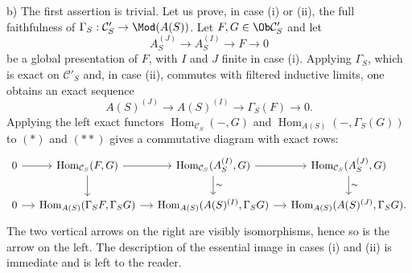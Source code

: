 b) The first assertion is trivial. Let us prove, in case (i) or (ii), the full faithfulness of $\Gamma_S:\mathcal C'_S\to\Mod(A(S))$. Let $F,G\in\Ob\mathcal C'_S$ and let
\[
A_S^{(J)}\longrightarrow A_S^{(I)}\longrightarrow F\longrightarrow0
\tag{$*$}
\]
be a global presentation of $F$, with $I$ and $J$ finite in case (i). Applying $\Gamma_S$, which is exact on $\mathcal C'_S$ and, in case (ii), commutes with filtered inductive limits, one obtains an exact sequence
\[
A(S)^{(J)}\longrightarrow A(S)^{(I)}\longrightarrow\Gamma_S(F)\longrightarrow0.
\tag{$**$}
\]
Applying the left exact functors $\operatorname{Hom}_{\mathcal C_S}(-,G)$ and $\operatorname{Hom}_{A(S)}(-,\Gamma_S(G))$ to $(*)$ and $(**)$ gives a commutative diagram with exact rows:
\[
\begin{tikzcd}[column sep=small]
0 \arrow[r] & \operatorname{Hom}_{\mathcal C_S}(F,G) \arrow[r] \arrow[d] &
\operatorname{Hom}_{\mathcal C_S}(A_S^{(I)},G) \arrow[r] \arrow[d,"\sim"] &
\operatorname{Hom}_{\mathcal C_S}(A_S^{(J)},G) \arrow[d,"\sim"] \\
0 \arrow[r] & \operatorname{Hom}_{A(S)}(\Gamma_SF,\Gamma_SG) \arrow[r] &
\operatorname{Hom}_{A(S)}(A(S)^{(I)},\Gamma_SG) \arrow[r] &
\operatorname{Hom}_{A(S)}(A(S)^{(J)},\Gamma_SG).
\end{tikzcd}
\]
The two vertical arrows on the right are visibly isomorphisms, hence so is the arrow on the left. The description of the essential image in cases (i) and (ii) is immediate and is left to the reader.

